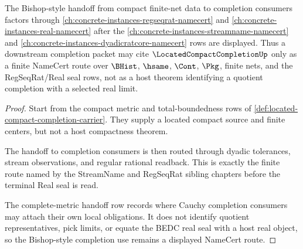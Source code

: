 \begin{theorem}
\label{thm:located-compact-completion-bishop-handoff}
The Bishop-style handoff from compact finite-net data to completion consumers factors through \autoref{ch:concrete-instances-regseqrat-namecert} and \autoref{ch:concrete-instances-real-namecert} after the \autoref{ch:concrete-instances-streamname-namecert} and \autoref{ch:concrete-instances-dyadicratcore-namecert} rows are displayed. Thus a downstream completion packet may cite $\LocatedCompactCompletionUp$ only as a finite NameCert route over $\BHist$, $\hsame$, $\Cont$, $\Pkg$, finite nets, and the RegSeqRat/Real seal rows, not as a host theorem identifying a quotient completion with a selected real limit.
\end{theorem}
\begin{proof}
Start from the compact metric and total-boundedness rows of \autoref{def:located-compact-completion-carrier}. They supply a located compact source and finite centers, but not a host compactness theorem.

The handoff to completion consumers is then routed through dyadic tolerances, stream observations, and regular rational readback. This is exactly the finite route named by the StreamName and RegSeqRat sibling chapters before the terminal Real seal is read.

The complete-metric handoff row records where Cauchy completion consumers may attach their own local obligations. It does not identify quotient representatives, pick limits, or equate the BEDC real seal with a host real object, so the Bishop-style completion use remains a displayed NameCert route.
\end{proof}


\begin{closurestatus}{\LocatedCompactCompletionUp}
  \theoryclosure{\seedClosure}
  \formalstatus{\unformalizedV}
\end{closurestatus}
